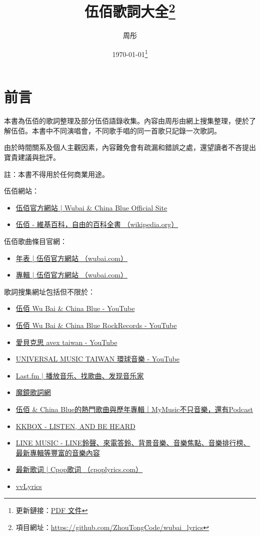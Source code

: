 \documentclass[UTF8,a4paper,oneside,twocolumn,12pt]{ctexbook}
\title{伍佰歌詞大全\thanks{項目網址：\url{https://github.com/ZhouTongCode/wubai_lyrics}}}
\author{周彤}
\date{\today\thanks{更新鏈接：\href{https://github.com/ZhouTongCode/wubai_lyrics/raw/master/document.pdf}{PDF 文件}}}
\begin{document}
\frontmatter
\maketitle

\onecolumn

\chapter*{前言}
本書為伍佰的歌詞整理及部分伍佰語錄收集。內容由周彤由網上搜集整理，便於了解伍佰。本書中不同演唱會，不同歌手唱的同一首歌只記錄一次歌詞。

由於時間關系及個人主觀因素，內容難免會有疏漏和錯誤之處，還望讀者不吝提出寶貴建議與批評。

註：本書不得用於任何商業用途。

伍佰網站：
\begin{itemize}
	\item \href{http://wubai.com/}{伍佰官方網站 | Wubai \& China Blue Official Site}
	\item \href{https://zh.wikipedia.org/zh-tw/伍佰}{伍佰 - 維基百科，自由的百科全書 （wikipedia.org）}
\end{itemize}

伍佰歌曲條目官網：
\begin{itemize}
	\item \href{http://wubai.com/biography/年表/}{年表 | 伍佰官方網站 （wubai.com）}
	\item \href{http://wubai.com/discography/專輯/}{專輯 | 伍佰官方網站 （wubai.com）}
\end{itemize}


歌詞搜集網址包括但不限於：
\begin{itemize}
	\item \href{https://www.youtube.com/channel/UCHocIer4qdnCmgvHlNrpqFA}{伍佰 Wu Bai \& China Blue - YouTube}
	\item \href{https://www.youtube.com/channel/UCCTYHJZvsRCLvm5Afi9XJXA}{伍佰 Wu Bai \& China Blue RockRecords - YouTube}
	\item \href{https://www.youtube.com/c/愛貝克思avextaiwan}{愛貝克思 avex taiwan - YouTube}
	\item \href{https://www.youtube.com/c/universaltwn/search?query=伍佰}{UNIVERSAL MUSIC TAIWAN 環球音樂 - YouTube}
	\item \href{https://www.last.fm/zh/}{Last.fm | 播放音乐、找歌曲、发现音乐家}
	\item \href{https://mojim.com/twznew.htm}{魔鏡歌詞網}
	\item \href{https://www.mymusic.net.tw/ux/w/singer/show/245}{伍佰 \& China Blue的熱門歌曲與歷年專輯｜MyMusic不只音樂，還有Podcast}
	\item \href{https://www.kkbox.com/tw/tc/}{KKBOX - LISTEN, AND BE HEARD}
	\item \href{https://music-tw.line.me/}{LINE MUSIC - LINE鈴聲、來電答鈴、背景音樂、音樂焦點、音樂排行榜、最新專輯等豐富的音樂內容}
	\item \href{https://www.cpoplyrics.com/}{最新歌词 | Cpop歌词 （cpoplyrics.com）}
	\item \href{https://vvlyrics.com/}{vvLyrics}
\end{itemize}
\end{document}
